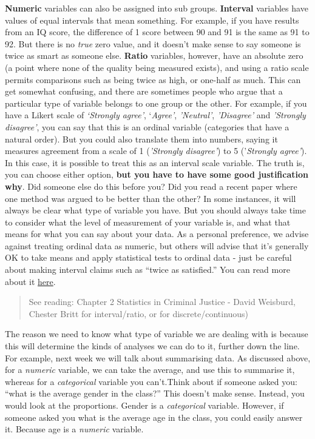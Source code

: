 \documentclass[
]{book}
\begin{document}
\textbf{Numeric} variables can also be assigned into sub groups. \textbf{Interval} variables have values of equal intervals that mean something. For example, if you have results from an IQ score, the difference of 1 score between 90 and 91 is the same as 91 to 92. But there is no \emph{true} zero value, and it doesn't make sense to say someone is twice as smart as someone else. \textbf{Ratio} variables, however, have an absolute zero (a point where none of the quality being measured exists), and using a ratio scale permits comparisons such as being twice as high, or one-half as much. This can get somewhat confusing, and there are sometimes people who argue that a particular type of variable belongs to one group or the other. For example, if you have a Likert scale of \emph{`Strongly agree'}, `\emph{Agree'}, \emph{'Neutral'}, \emph{'Disagree'} and \emph{'Strongly disagree'}, you can say that this is an ordinal variable (categories that have a natural order). But you could also translate them into numbers, saying it measures agreement from a scale of 1 (\emph{'Strongly disagree'}) to 5 ('\emph{Strongly agree'}). In this case, it is possible to treat this as an interval scale variable. The truth is, you can choose either option, \textbf{but you have to have some good justification why}. Did someone else do this before you? Did you read a recent paper where one method was argued to be better than the other? In some instances, it will always be clear what type of variable you have. But you should always take time to consider what the level of measurement of your variable is, and what that means for what you can say about your data. As a personal preference, we advise against treating ordinal data as numeric, but others will advise that it's generally OK to take means and apply statistical tests to ordinal data - just be careful about making interval claims such as ``twice as satisfied.'' You can read more about it \href{http://www.usablestats.com/lessons/noir}{here}.

\begin{quote}
See reading: Chapter 2 Statistics in Criminal Justice - David Weisburd, Chester Britt for interval/ratio, or for discrete/continuous)
\end{quote}

The reason we need to know what type of variable we are dealing with is because this will determine the kinds of analyses we can do to it, further down the line. For example, next week we will talk about summarising data. As discussed above, for a \emph{numeric} variable, we can take the average, and use this to summarise it, whereas for a \emph{categorical} variable you can't.Think about if someone asked you: ``what is the average gender in the class?'' This doesn't make sense. Instead, you would look at the proportions. Gender is a \emph{categorical} variable. However, if someone asked you what is the average age in the class, you could easily answer it. Because age is a \emph{numeric} variable.
\end{document}
